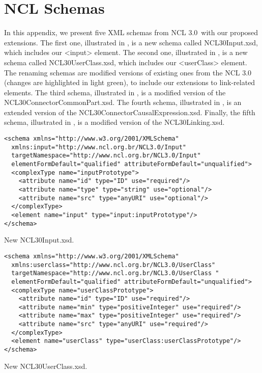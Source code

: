 \chapter{NCL Schemas}
\label{annex:schemas}

In this appendix, we present five XML schemas from NCL 3.0\footnotemark~with
our proposed extensions. The first one, illustrated in , is a
new schema  called NCL30Input.xsd, which includes our <input> element. The
second one,  illustrated in , is a new schema called
NCL30UserClass.xsd,  which  includes our <userClass> element. The renaming
schemas are modified  versions of existing ones from the NCL 3.0 (changes are
highlighted in light  green), to include our extensions to link-related
elements. The third schema, illustrated in , is a modified
version of the NCL30ConnectorCommonPart.xsd. The fourth schema, illustrated in
, is an extended version of
the NCL30ConnectorCausalExpression.xsd. Finally, the fifth schema, illustrated
in , is a modified version of the NCL30Linking.xsd.



\begin{listing}[!ht]
\begin{verbatim}
<schema xmlns="http://www.w3.org/2001/XMLSchema"
  xmlns:input="http://www.ncl.org.br/NCL3.0/Input"
  targetNamespace="http://www.ncl.org.br/NCL3.0/Input"
  elementFormDefault="qualified" attributeFormDefault="unqualified">
  <complexType name="inputPrototype">
    <attribute name="id" type="ID" use="required"/>
    <attribute name="type" type="string" use="optional"/>
    <attribute name="src" type="anyURI" use="optional"/>
  </complexType>
  <element name="input" type="input:inputPrototype"/>
</schema>
\end{verbatim}
\caption{New NCL30Input.xsd.}
\label{list:annexa1}
\end{listing}

\begin{listing}[!ht]
\begin{verbatim}
<schema xmlns="http://www.w3.org/2001/XMLSchema"
  xmlns:userclass="http://www.ncl.org.br/NCL3.0/UserClass"
  targetNamespace="http://www.ncl.org.br/NCL3.0/UserClass "
  elementFormDefault="qualified" attributeFormDefault="unqualified">
  <complexType name="userClassPrototype">
    <attribute name="id" type="ID" use="required"/>
    <attribute name="min" type="positiveInteger" use="required"/>
    <attribute name="max" type="positiveInteger" use="required"/>
    <attribute name="src" type="anyURI" use="required"/>
  </complexType>
  <element name="userClass" type="userClass:userClassPrototype"/>
</schema>
\end{verbatim}
\caption{New NCL30UserClass.xsd.}
\label{list:annexa2}
\end{listing}

